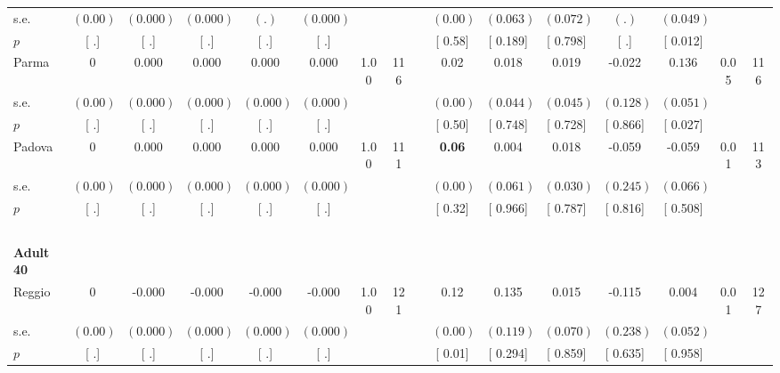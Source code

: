 \begin{longtable}{L{8em} c c c c c c c p{1em} c c c c c c c}
\quad \quad \quad \quad s.e.& $ (     0.00)$ & $ (    0.000)$ & $ (    0.000)$ & $ (        .)$ & $ (    0.000)$ & & & & $ (     0.00)$ & $ (    0.063)$ & $ (    0.072)$ & $ (        .)$ & $ (    0.049)$ & &  \\*
\quad \quad \quad \quad $ p$ & [        .] & [        .] & [        .] & [        .] & [        .] & & & & [     0.58] & [    0.189] & [    0.798] & [        .] & [    0.012] & &  \\[1em]
\quad \quad \quad Parma& 0 &     0.000 &     0.000 &     0.000 &     0.000 &      1.00 &       116 & & 0.02 &     0.018 &     0.019 &    -0.022 & $ \mathbf{    0.136}$ &      0.05 &       116  \\*
\quad \quad \quad \quad s.e.& $ (     0.00)$ & $ (    0.000)$ & $ (    0.000)$ & $ (    0.000)$ & $ (    0.000)$ & & & & $ (     0.00)$ & $ (    0.044)$ & $ (    0.045)$ & $ (    0.128)$ & $ (    0.051)$ & &  \\*
\quad \quad \quad \quad $ p$ & [        .] & [        .] & [        .] & [        .] & [        .] & & & & [     0.50] & [    0.748] & [    0.728] & [    0.866] & [    0.027] & &  \\[1em]
\quad \quad \quad Padova& 0 &     0.000 &     0.000 &     0.000 &     0.000 &      1.00 &       111 & & \textbf{     0.06} &     0.004 &     0.018 &    -0.059 &    -0.059 &      0.01 &       113  \\*
\quad \quad \quad \quad s.e.& $ (     0.00)$ & $ (    0.000)$ & $ (    0.000)$ & $ (    0.000)$ & $ (    0.000)$ & & & & $ (     0.00)$ & $ (    0.061)$ & $ (    0.030)$ & $ (    0.245)$ & $ (    0.066)$ & &  \\*
\quad \quad \quad \quad $ p$ & [        .] & [        .] & [        .] & [        .] & [        .] & & & & [     0.32] & [    0.966] & [    0.787] & [    0.816] & [    0.508] & &  \\[1em]
~\\[1em]
\quad \quad \textbf{Adult 40} & & & & & & & & & & & & & & & \\* 
\quad \quad \quad Reggio& 0 &    -0.000 &    -0.000 &    -0.000 &    -0.000 &      1.00 &       121 & & 0.12 &     0.135 &     0.015 &    -0.115 &     0.004 &      0.01 &       127  \\*
\quad \quad \quad \quad s.e.& $ (     0.00)$ & $ (    0.000)$ & $ (    0.000)$ & $ (    0.000)$ & $ (    0.000)$ & & & & $ (     0.00)$ & $ (    0.119)$ & $ (    0.070)$ & $ (    0.238)$ & $ (    0.052)$ & &  \\*
\quad \quad \quad \quad $ p$ & [        .] & [        .] & [        .] & [        .] & [        .] & & & & [     0.01] & [    0.294] & [    0.859] & [    0.635] & [    0.958] & &  \\[1em]

\end{longtable}
